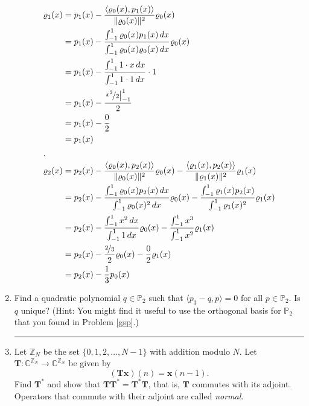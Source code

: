 \documentclass[12pt]{amsart}
\newcommand{\1}{\mathbbm{1}}
\numberwithin{equation}{section}
\numberwithin{Theorem}{section}
\theoremstyle{plain} %
\theoremstyle{definition}
\theoremstyle{remark}
\begin{document}
\begin{enumerate}[1.]
\begin{align*}
	\varrho_1(x)
	&=p_1(x)-\frac{\langle\varrho_0(x),p_1(x)\rangle}{\|\varrho_0(x)\|^2}\varrho_0(x) \\
	&=p_1(x)-\frac{\int_{-1}^{1}\varrho_0(x)p_1(x)\,dx}{\int_{-1}^{1}\varrho_0(x)\varrho_0(x)\,dx}\varrho_0(x) \\
	&=p_1(x)-\frac{\int_{-1}^{1}1\cdot x\,dx}{\int_{-1}^{1}1\cdot1\,dx}\cdot1 \\
	&=p_1(x)-\frac{\left.\nicefrac{x^2}{2}\right|_{-1}^1}{2} \\
	&=p_1(x)-\frac{0}{2} \\
	&=p_1(x) \\
\intertext{.}
	\varrho_2(x)
	&=p_2(x)-\frac{\langle\varrho_0(x),p_2(x)\rangle}{\|\varrho_0(x)\|^2}\varrho_0(x) -\frac{\langle\varrho_1(x),p_2(x)\rangle}{\|\varrho_1(x)\|^2}\varrho_1(x) \\
	&=p_2(x)-\frac{\int_{-1}^{1}\varrho_0(x)p_2(x)\,dx}{\int_{-1}^{1}\varrho_0(x)^2\,dx}\varrho_0(x) -\frac{\int_{-1}^{1}\varrho_1(x)p_2(x)}{\int_{-1}^{1}\varrho_1(x)^2}\varrho_1(x) \\
	&=p_2(x)-\frac{\int_{-1}^{1}x^2\,dx}{\int_{-1}^{1}1\,dx}\varrho_0(x) -\frac{\int_{-1}^{1}x^3}{\int_{-1}^{1}x^2}\varrho_1(x) \\
	&=p_2(x)-\frac{\nicefrac{2}{3}}{2}\varrho_0(x) -\frac{0}{2}\varrho_1(x) \\
	&=p_2(x)-\frac{1}{3}p_0(x) \\
\end{align*}



\item Find a quadratic polynomial \(q\in\mathbb{P}_{2}\) such that \(\langle p_{3}-q,p\rangle = 0\) for all \(p\in\mathbb{P}_{2}\). Is \(q\) unique? (Hint: You might find it useful to use the orthogonal basis for \(\mathbb{P}_{2}\) that you found in Problem \ref{gsp}.) \bigskip

\hrule
\bigskip




\item Let \(\mathbb{Z}_{N}\) be the set \(\{0,1,2,\ldots,N-1\}\) with addition modulo \(N\). Let \(\mathbf{T}:\mathbb{C}^{\mathbb{Z}_{N}}\to\mathbb{C}^{\mathbb{Z}_{N}}\) be given by \[(\mathbf{Tx})(n) = \mathbf{x}(n-1).\]
Find \(\mathbf{T}^{\ast}\) and show that \(\mathbf{TT}^{\ast}=\mathbf{T}^{\ast}\mathbf{T}\), that is, \(\mathbf{T}\) commutes with its adjoint. Operators that commute with their adjoint are called \textit{normal}.\bigskip


\end{enumerate}
\end{document}
